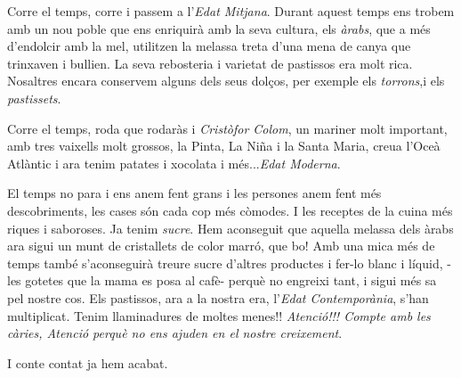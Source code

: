 \begin{news}
Corre el temps, corre i passem a l’\emph{Edat Mitjana}. Durant aquest temps ens trobem amb un nou poble que ens enriquirà amb la seva cultura, els \emph{àrabs}, que a més d’endolcir amb la mel, utilitzen la melassa treta d’una mena de canya que trinxaven i bullien. La seva rebosteria i varietat de pastissos era molt rica. Nosaltres encara conservem alguns dels seus dolços, per exemple els \emph{torrons},i els \emph{pastissets}.

Corre el temps,  roda que rodaràs i \emph{Cristòfor Colom},  un mariner molt important, amb tres vaixells molt grossos, la Pinta, La Niña i la Santa Maria, creua l’Oceà Atlàntic i ara tenim patates i xocolata i més...\emph{Edat Moderna}.

El temps no para i ens anem fent grans i les persones anem fent més descobriments, les cases són cada cop més còmodes. I les receptes de la cuina més riques i saboroses. Ja tenim \emph{sucre}. Hem aconseguit que  aquella melassa dels àrabs ara sigui un munt de cristallets de color marró, que bo! Amb una mica més de temps també s’aconseguirà treure sucre d’altres productes i fer-lo blanc i líquid, -les gotetes que la mama es posa al cafè- perquè no engreixi tant, i sigui més sa pel nostre cos. Els pastissos, ara a la nostra era, l’\emph{Edat Contemporània}, s’han multiplicat. Tenim llaminadures de moltes menes!! \emph{Atenció!!! Compte amb les càries, Atenció perquè no ens ajuden en el nostre creixement}.

I conte contat ja hem acabat. 
  
\end{news}
